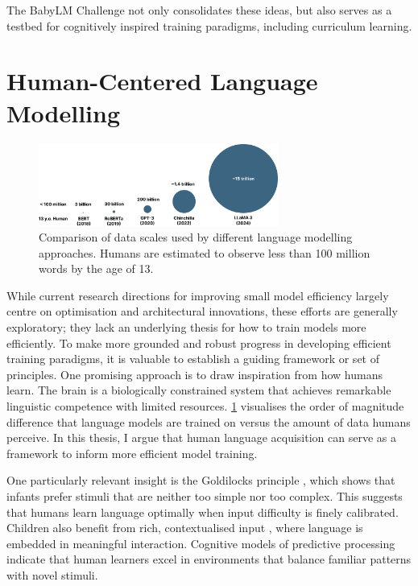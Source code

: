 The BabyLM Challenge not only consolidates these ideas, but also serves as a testbed for cognitively inspired training paradigms, including curriculum learning.

\section{Human-Centered Language Modelling}

\begin{figure}[ht!]
    \centering
    \includegraphics[width=0.7\textwidth]{chapters/background/figures/data_comparison.pdf}
    \caption{Comparison of data scales used by different language modelling approaches. Humans are estimated to observe less than 100 million words by the age of 13.}
    \label{fig:data-comparison}
\end{figure}


While current research directions for improving small model efficiency largely centre on optimisation and architectural innovations, these efforts are generally exploratory; they lack an underlying thesis for how to train models more efficiently. To make more grounded and robust progress in developing efficient training paradigms, it is valuable to establish a guiding framework or set of principles. One promising approach is to draw inspiration from how humans learn. The brain is a biologically constrained system that achieves remarkable linguistic competence with limited resources. \cref{fig:data-comparison} visualises the order of magnitude difference that language models are trained on versus the amount of data humans perceive. In this thesis, I argue that human language acquisition can serve as a framework to inform more efficient model training.

One particularly relevant insight is the Goldilocks principle \citep{kidd2012goldilocks}, which shows that infants prefer stimuli that are neither too simple nor too complex. This suggests that humans learn language optimally when input difficulty is finely calibrated. Children also benefit from rich, contextualised input \citep{bergelson2015early, weizman2001lexical}, where language is embedded in meaningful interaction. Cognitive models of predictive processing~\citep{caucheteux2023evidence} indicate that human learners excel in environments that balance familiar patterns with novel stimuli. 

